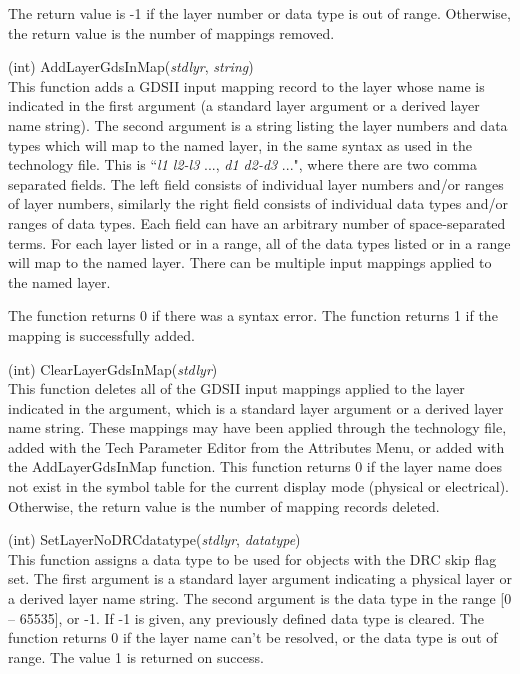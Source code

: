 \begin{description}
The return value is -1 if the layer number or data type is out of
range.  Otherwise, the return value is the number of mappings
removed.

\item{(int) \vt AddLayerGdsInMap({\it stdlyr\/}, {\it string\/})}\\
This function adds a GDSII input mapping record to the layer whose
name is indicated in the first argument (a standard layer argument or
a derived layer name string).  The second argument is a string listing
the layer numbers and data types which will map to the named layer, in
the same syntax as used in the technology file.  This is ``{\it l1
l2-l3} ..., {\it d1 d2-d3} ...", where there are two comma separated
fields.  The left field consists of individual layer numbers and/or
ranges of layer numbers, similarly the right field consists of
individual data types and/or ranges of data types.  Each field can
have an arbitrary number of space-separated terms.  For each layer
listed or in a range, all of the data types listed or in a range will
map to the named layer.  There can be multiple input mappings applied
to the named layer.

The function returns 0 if there was a syntax error.  The function
returns 1 if the mapping is successfully added.

\item{(int) \vt ClearLayerGdsInMap({\it stdlyr\/})}\\
This function deletes all of the GDSII input mappings applied to the
layer indicated in the argument, which is a standard layer argument or
a derived layer name string.  These mappings may have been applied
through the technology file, added with the {\cb Tech Parameter
Editor} from the {\cb Attributes Menu}, or added with the {\vt
AddLayerGdsInMap} function.  This function returns 0 if the layer name
does not exist in the symbol table for the current display mode
(physical or electrical).  Otherwise, the return value is the number
of mapping records deleted.

\item{(int) \vt SetLayerNoDRCdatatype({\it stdlyr\/}, {\it datatype\/})}\\
This function assigns a data type to be used for objects with the DRC
skip flag set.  The first argument is a standard layer argument
indicating a physical layer or a derived layer name string.  The
second argument is the data type in the range [0 -- 65535], or -1.  If
-1 is given, any previously defined data type is cleared.  The
function returns 0 if the layer name can't be resolved, or the data
type is out of range.  The value 1 is returned on success.

\end{description}

